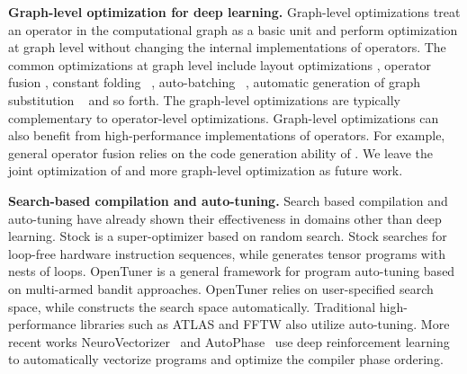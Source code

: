 \textbf{Graph-level optimization for deep learning.} Graph-level optimizations treat an operator in the computational graph as a basic unit and perform optimization at graph level without changing the internal implementations of operators.
The common optimizations at graph level include layout optimizations \cite{liu2019optimizing}, operator fusion \cite{chen2018tvm, nvidia2017tensorrt, zheng2020fusionstitching}, constant folding ~\cite{roesch2019relay}, auto-batching ~\cite{looks2017deep}, automatic generation of graph substitution ~\cite{jia2019taso} and so forth. The graph-level optimizations are typically complementary to operator-level optimizations. Graph-level optimizations can also benefit from high-performance implementations of operators.
For example, general operator fusion relies on the code generation ability of \Ansor. We leave the joint optimization of \Ansor and more graph-level optimization as future work.

\textbf{Search-based compilation and auto-tuning.}
Search based compilation and auto-tuning have already shown their effectiveness in domains other than deep learning.
Stock \cite{schkufza2013stochastic} is a super-optimizer based on random search.
Stock searches for loop-free hardware instruction sequences, while \Ansor generates tensor programs with nests of loops.
OpenTuner \cite{ansel2014opentuner} is a general framework for program auto-tuning based on multi-armed bandit approaches.
OpenTuner relies on user-specified search space, while \Ansor constructs the search space automatically.
Traditional high-performance libraries such as ATLAS\cite{whaley1998automatically} and FFTW \cite{frigo1998fftw} also utilize auto-tuning.
More recent works NeuroVectorizer~\cite{haj2020neurovectorizer} and AutoPhase~\cite{huang2019autophase,haj2020autophase} use deep reinforcement learning to automatically vectorize programs and optimize the compiler phase ordering.

